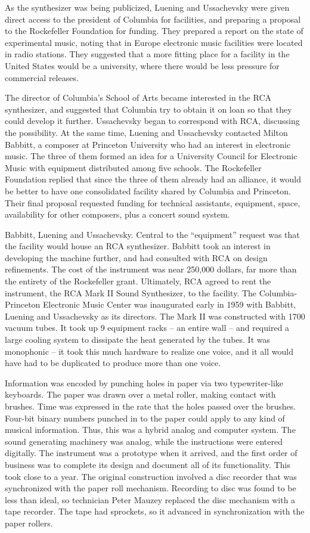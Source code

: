 As the synthesizer was being publicized, Luening and Ussachevsky were given direct access to the president of Columbia for facilities, and preparing a proposal to the Rockefeller Foundation for funding. They prepared a report on the state of experimental music, noting that in Europe electronic music facilities were located in radio stations. They suggested that a more fitting place for a facility in the United States would be a university, where there would be less pressure for commercial releases.

The director of Columbia's School of Arts became interested in the RCA synthesizer, and suggested that Columbia try to obtain it on loan so that they could develop it further. Ussachevsky began to correspond with RCA, discussing the possibility. At the same time, Luening and Ussachevsky contacted Milton Babbitt, a composer at Princeton University who had an interest in electronic music. The three of them formed an idea for a University Council for Electronic Music with equipment distributed among five schools. The Rockefeller Foundation replied that since the three of them already had an alliance, it would be better to have one consolidated facility shared by Columbia and Princeton. Their final proposal requested funding for technical assistants, equipment, space, availability for other composers, plus a concert sound system.


Babbitt, Luening and Ussachevsky. Central to the ``equipment'' request was that the facility would house an RCA synthesizer. Babbitt took an interest in developing the machine further, and had consulted with RCA on design refinements. The cost of the instrument was near 250,000 dollars, far more than the entirety of the Rockefeller grant. Ultimately, RCA agreed to rent the instrument, the RCA Mark II Sound Synthesizer, to the facility. The Columbia-Princeton Electronic Music Center was inaugurated early in 1959 with Babbitt, Luening and Ussachevsky as its directors. The Mark II was constructed with 1700 vacuum tubes. It took up 9 equipment racks -- an entire wall -- and required a large cooling system to dissipate the heat generated by the tubes. It was monophonic -- it took this much hardware to realize one voice, and it all would have had to be duplicated to produce more than one voice.

Information was encoded by punching holes in paper via two typewriter-like keyboards. The paper was drawn over a metal roller, making contact with brushes. Time was expressed in the rate that the holes passed over the brushes. Four-bit binary numbers punched in to the paper could apply to any kind of musical information. Thus, this was a hybrid analog and computer system. The sound generating machinery was analog, while the instructions were entered digitally. The instrument was a prototype when it arrived, and the first order of business was to complete its design and document all of its functionality. This took close to a year. The original construction involved a disc recorder that was synchronized with the paper roll mechanism. Recording to disc was found to be less than ideal, so technician Peter Mauzey replaced the disc mechanism with a tape recorder. The tape had sprockets, so it advanced in synchronization with the paper rollers.

